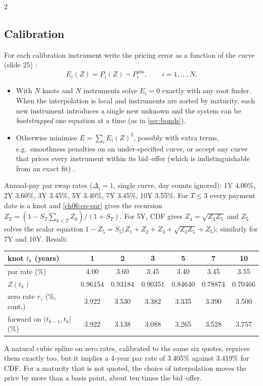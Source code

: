 \begin{paracol}{2}
\subsection{Calibration}
For each calibration instrument write the pricing error as a function of the curve (slide 25)
:
\[
  E_i(Z)=P_i(Z)-P_i^{\mathrm{obs}},\qquad i=1,\dots,N .
\]
\begin{itemize}
  \item With $N$ knots and $N$ instruments solve $E_i=0$ exactly with any root finder. When the interpolation is
        local and instruments are sorted by maturity, each new instrument introduces a single new unknown and the
        system can be \emph{bootstrapped} one equation at a time (as in \cref{sec:bonds}).
  \item Otherwise minimise $E=\sum_iE_i(Z)^2$, possibly with extra terms, e.g.\ smoothness penalties on an
        under-specified curve, or accept any curve that prices every instrument within its bid--offer (which is
        indistinguishable from an exact fit) .
\end{itemize}

\begin{example}\label{ch06:ex-boot}
Annual-pay par swap rates ($\Delta_i=1$, single curve, day counts ignored): 1Y 4.00\%, 2Y 3.60\%, 3Y 3.45\%,
5Y 3.40\%, 7Y 3.45\%, 10Y 3.55\%. For $T\le3$ every payment date is a knot and \eqref{ch06:eq-par} gives the
recursion $Z_T=(1-S_T\sum_{k<T}Z_k)/(1+S_T)$. For 5Y, CDF gives $Z_4=\sqrt{Z_3Z_5}$ and $Z_5$ solves the scalar
equation $1-Z_5=S_5\bigl(Z_1+Z_2+Z_3+\sqrt{Z_3Z_5}+Z_5\bigr)$; similarly for 7Y and 10Y. Result:
\begin{center}\small
\begin{tabular}{@{}lcccccc@{}}
\toprule
knot $t_k$ (years) & 1 & 2 & 3 & 5 & 7 & 10\\
\midrule
par rate (\%) & 4.00 & 3.60 & 3.45 & 3.40 & 3.45 & 3.55\\
$Z(t_k)$ & 0.96154 & 0.93184 & 0.90351 & 0.84640 & 0.78874 & 0.70466\\
zero rate $r_z$ (\%, cont.) & 3.922 & 3.530 & 3.382 & 3.335 & 3.390 & 3.500\\
forward on $(t_{k-1},t_k]$ (\%) & 3.922 & 3.138 & 3.088 & 3.265 & 3.528 & 3.757\\
\bottomrule
\end{tabular}
\end{center}
A natural cubic spline on zero rates, calibrated to the same six quotes, reprices them exactly too, but it
implies a 4-year par rate of 3.405\% against 3.419\% for CDF. For a maturity that is not quoted, the choice of
interpolation moves the price by more than a basis point, about ten times the bid--offer.
\end{example}


\end{paracol}
